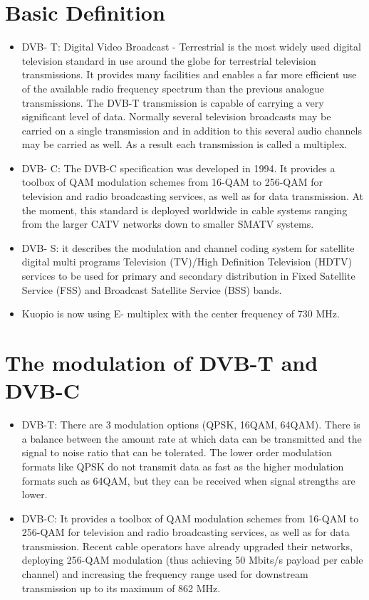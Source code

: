 \documentclass[english]{article}
\begin{document}
\section{Basic Definition}
\begin{itemize}
\item DVB- T: Digital Video Broadcast - Terrestrial is the most widely used digital television standard in use around the globe for terrestrial television transmissions. It provides many facilities and enables a far more efficient use of the available radio frequency spectrum than the previous analogue transmissions. The DVB-T transmission is capable of carrying a very significant level of data. Normally several television broadcasts may be carried on a single transmission and in addition to this several audio channels may be carried as well. As a result each transmission is called a multiplex.
\item DVB- C: The DVB-C specification was developed in 1994. It provides a toolbox of QAM modulation schemes from 16-QAM to 256-QAM for television and radio broadcasting services, as well as for data transmission. At the moment, this standard is deployed worldwide in cable systems ranging from the larger CATV networks down to smaller SMATV systems.
\item DVB- S: it describes the modulation and channel coding system for satellite digital multi programs Television (TV)/High Definition Television (HDTV) services to be used for primary and secondary distribution in Fixed Satellite Service (FSS) and Broadcast Satellite Service (BSS) bands.
\item Kuopio is now using E- multiplex with the center frequency of 730 MHz.
\end{itemize}
\section{The modulation of DVB-T and DVB-C}
\begin{itemize}
\item DVB-T: There are 3 modulation options (QPSK, 16QAM, 64QAM). There is a balance between the amount rate at which data can be transmitted and the signal to noise ratio that can be tolerated. The lower order modulation formats like QPSK do not transmit data as fast as the higher modulation formats such as 64QAM, but they can be received when signal strengths are lower.
\item DVB-C: It provides a toolbox of QAM modulation schemes from 16-QAM to 256-QAM for television and radio broadcasting services, as well as for data transmission. Recent
cable operators have already upgraded their networks, deploying 256-QAM modulation (thus achieving 50 Mbits/s payload per cable channel) and increasing the frequency range used for downstream transmission up to its maximum of 862 MHz.
\end{itemize}
\end{document}

